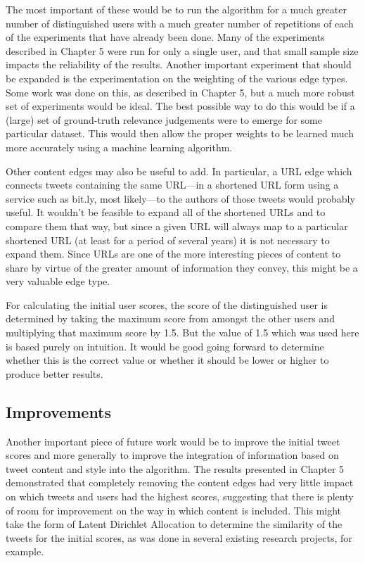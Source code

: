 The most important of these would be to run the algorithm for a much greater number of distinguished users with a much greater number of repetitions of each of the experiments that have already been done. Many of the experiments described in Chapter 5 were run for only a single user, and that small sample size impacts the reliability of the results. Another important experiment that should be expanded is the experimentation on the weighting of the various edge types. Some work was done on this, as described in Chapter 5, but a much more robust set of experiments would be ideal. The best possible way to do this would be if a (large) set of ground-truth relevance judgements were to emerge for some particular dataset. This would then allow the proper weights to be learned much more accurately using a machine learning algorithm.

Other content edges may also be useful to add. In particular, a URL edge which connects tweets containing the same URL---in a shortened URL form using a service such as bit.ly, most likely---to the authors of those tweets would probably useful. It wouldn't be feasible to expand all of the shortened URLs and to compare them that way, but since a given URL will always map to a particular shortened URL (at least for a period of several years) it is not necessary to expand them. Since URLs are one of the more interesting pieces of content to share by virtue of the greater amount of information they convey, this might be a very valuable edge type.

For calculating the initial user scores, the score of the distinguished user is determined by taking the maximum score from amongst the other users and multiplying that maximum score by 1.5. But the value of 1.5 which was used here is based purely on intuition. It would be good going forward to determine whether this is the correct value or whether it should be lower or higher to produce better results.

\subsection{Improvements}

Another important piece of future work would be to improve the initial tweet scores and more generally to improve the integration of information based on tweet content and style into the algorithm. The results presented in Chapter 5 demonstrated that completely removing the content edges had very little impact on which tweets and users had the highest scores, suggesting that there is plenty of room for improvement on the way in which content is included. This might take the form of Latent Dirichlet Allocation to determine the similarity of the tweets for the initial scores, as was done in several existing research projects, for example.

